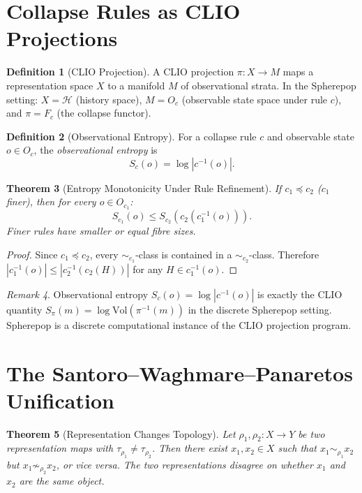 \documentclass[12pt, a4paper, openany]{book}
\theoremstyle{plain}
\newtheorem{theorem}{Theorem}[chapter]
\theoremstyle{definition}
\newtheorem{definition}[theorem]{Definition}
\theoremstyle{remark}
\newtheorem{remark}[theorem]{Remark}
\newcommand{\calH}{\mathcal{H}}
\begin{document}
\section{Collapse Rules as CLIO Projections}

\begin{definition}[CLIO Projection]
A CLIO projection $\pi : X \to M$ maps a representation space $X$ to a manifold
$M$ of observational strata. In the Spherepop setting: $X = \calH$ (history
space), $M = O_c$ (observable state space under rule $c$), and $\pi = F_c$
(the collapse functor).
\end{definition}

\begin{definition}[Observational Entropy]
For a collapse rule $c$ and observable state $o \in O_c$, the
\emph{observational entropy} is
\[
S_c(o) = \log |c^{-1}(o)|.
\]
\end{definition}

\begin{theorem}[Entropy Monotonicity Under Rule Refinement]
If $c_1 \preceq c_2$ ($c_1$ finer), then for every $o \in O_{c_1}$:
\[
S_{c_1}(o) \leq S_{c_2}(c_2(c_1^{-1}(o))).
\]
Finer rules have smaller or equal fibre sizes.
\end{theorem}

\begin{proof}
Since $c_1 \preceq c_2$, every $\sim_{c_1}$-class is contained in a
$\sim_{c_2}$-class. Therefore $|c_1^{-1}(o)| \leq |c_2^{-1}(c_2(H))|$ for
any $H \in c_1^{-1}(o)$.
\end{proof}

\begin{remark}
Observational entropy $S_c(o) = \log |c^{-1}(o)|$ is exactly the CLIO quantity
$S_\pi(m) = \log \mathrm{Vol}(\pi^{-1}(m))$ in the discrete Spherepop setting.
Spherepop is a discrete computational instance of the CLIO projection program.
\end{remark}

\section{The Santoro--Waghmare--Panaretos Unification}

\begin{theorem}[Representation Changes Topology]
Let $\rho_1, \rho_2 : X \to Y$ be two representation maps with $\tau_{\rho_1} \neq \tau_{\rho_2}$. Then there exist $x_1, x_2 \in X$ such that $x_1 \sim_{\rho_1} x_2$
but $x_1 \not\sim_{\rho_2} x_2$, or vice versa. The two representations disagree
on whether $x_1$ and $x_2$ are the same object.
\end{theorem}
\end{document}
